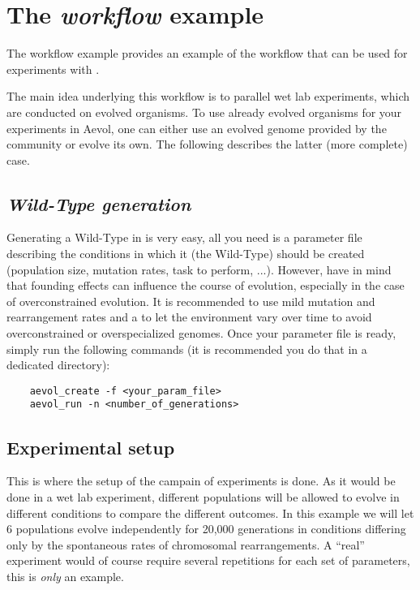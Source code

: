 \section{The \emph{workflow} example}

The workflow example provides an example of the workflow that can be used for experiments with \aevol{}.

The main idea underlying this workflow is to parallel wet lab experiments, which are conducted on evolved organisms.
To use already evolved organisms for your experiments in Aevol, one can either use an evolved genome provided by the community or evolve its own. The following describes the latter (more complete) case.


\subsection{\emph{Wild-Type generation}}
Generating a Wild-Type in \aevol{} is very easy, all you need is a parameter file describing the conditions in which it (the Wild-Type) should be created (population size, mutation rates, task to perform, ...).
However, have in mind that founding effects can influence the course of evolution, especially in the case of overconstrained evolution. It is recommended to use mild mutation and rearrangement rates and a to let the environment vary over time to avoid overconstrained or overspecialized genomes.
Once your parameter file is ready, simply run the following commands (it is recommended you do that in a dedicated directory):

\begin{verbatim}
	aevol_create -f <your_param_file>
	aevol_run -n <number_of_generations>
\end{verbatim}



\subsection{Experimental setup}
This is where the setup of the campain of experiments is done.
As it would be done in a wet lab experiment, different populations will be allowed to evolve in different conditions to compare the different outcomes. In this example we will let 6 populations evolve independently for 20,000 generations in conditions differing only by the spontaneous rates of chromosomal rearrangements. A ``real'' experiment would of course require several repetitions for each set of parameters, this is \emph{only} an example.

